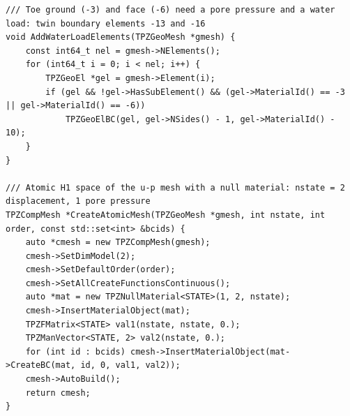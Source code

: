 \documentclass[11pt,a4paper]{article}
\newcommand{\cc}[1]{\texttt{\detokenize{#1}}} %
\begin{document}
\begin{lstlisting}[caption={Elementos gêmeos, malhas atômicas e malha multifísica u--p (\cc{Projects/SlopeDrawdown/main.cpp}).},label=lst:up]
/// Toe ground (-3) and face (-6) need a pore pressure and a water load: twin boundary elements -13 and -16
void AddWaterLoadElements(TPZGeoMesh *gmesh) {
    const int64_t nel = gmesh->NElements();
    for (int64_t i = 0; i < nel; i++) {
        TPZGeoEl *gel = gmesh->Element(i);
        if (gel && !gel->HasSubElement() && (gel->MaterialId() == -3 || gel->MaterialId() == -6))
            TPZGeoElBC(gel, gel->NSides() - 1, gel->MaterialId() - 10);
    }
}

/// Atomic H1 space of the u-p mesh with a null material: nstate = 2 displacement, 1 pore pressure
TPZCompMesh *CreateAtomicMesh(TPZGeoMesh *gmesh, int nstate, int order, const std::set<int> &bcids) {
    auto *cmesh = new TPZCompMesh(gmesh);
    cmesh->SetDimModel(2);
    cmesh->SetDefaultOrder(order);
    cmesh->SetAllCreateFunctionsContinuous();
    auto *mat = new TPZNullMaterial<STATE>(1, 2, nstate);
    cmesh->InsertMaterialObject(mat);
    TPZFMatrix<STATE> val1(nstate, nstate, 0.);
    TPZManVector<STATE, 2> val2(nstate, 0.);
    for (int id : bcids) cmesh->InsertMaterialObject(mat->CreateBC(mat, id, 0, val1, val2));
    cmesh->AutoBuild();
    return cmesh;
}


\end{lstlisting}
\end{document}
